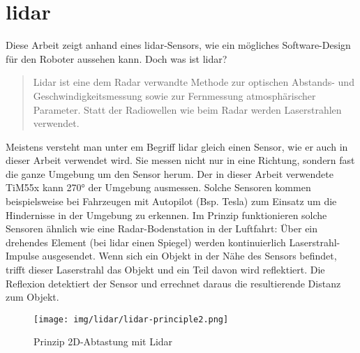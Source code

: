 \section{\acrshort{lidar}}
Diese Arbeit zeigt anhand eines \acrshort{lidar}-Sensors, wie ein mögliches Software-Design für den Roboter aussehen kann. Doch was ist \acrshort{lidar}?
\begin{quote}
	Lidar ist eine dem Radar verwandte Methode zur optischen Abstands- und Geschwindigkeitsmessung sowie zur Fernmessung atmosphärischer Parameter. Statt der Radiowellen wie beim Radar werden Laserstrahlen verwendet. \cite{wikipedia-lidar}
\end{quote}
Meistens versteht man unter em Begriff \acrshort{lidar} gleich einen Sensor, wie er auch in dieser Arbeit verwendet wird. Sie messen nicht nur in eine Richtung, sondern fast die ganze Umgebung um den Sensor herum. Der in dieser Arbeit verwendete TiM55x kann 270° der Umgebung ausmessen. Solche Sensoren kommen beispielsweise bei Fahrzeugen mit Autopilot (Bsp. Tesla) zum Einsatz um die Hindernisse in der Umgebung zu erkennen. Im Prinzip funktionieren solche Sensoren ähnlich wie eine Radar-Bodenstation in der Luftfahrt: Über ein drehendes Element (bei \acrshort{lidar} einen Spiegel) werden kontinuierlich Laserstrahl-Impulse ausgesendet. Wenn sich ein Objekt in der Nähe des Sensors befindet, trifft dieser Laserstrahl das Objekt und ein Teil davon wird reflektiert. Die Reflexion detektiert der Sensor und errechnet daraus die resultierende Distanz zum Objekt.
\begin{figure}[H]
	\centering
	\texttt{[image: img/lidar/lidar-principle2.png]}
	\caption{Prinzip 2D-Abtastung mit Lidar \cite{wikipedia-lidar}}
	\label{fig:lidar-principle}
\end{figure}


